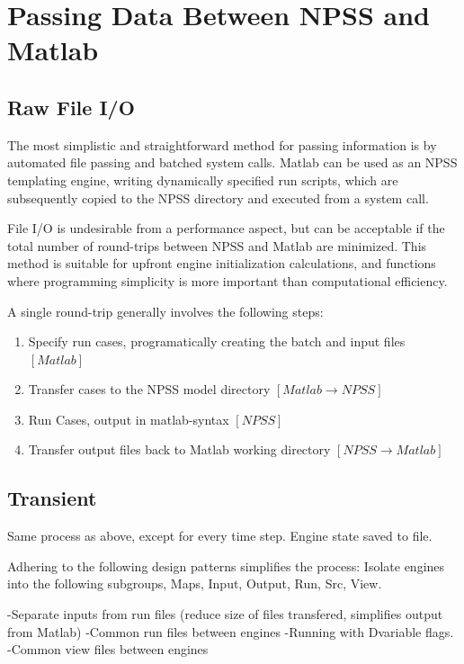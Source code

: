 \documentclass[heading.tex]{subfiles}
\begin{document}
\section{Passing Data Between NPSS and Matlab}
\subsection{Raw File I/O}

The most simplistic and straightforward method for passing information is by automated file passing and batched system calls.
Matlab can be used as an NPSS templating engine, writing dynamically specified run scripts, which are subsequently
copied to the NPSS directory and executed from a system call.

File I/O is undesirable from a performance aspect, but can be acceptable if the total number of round-trips between
NPSS and Matlab are minimized. This method is suitable for upfront engine initialization calculations, 
and functions where programming simplicity is more important than computational efficiency.

A single round-trip generally involves the following steps:

\begin{enumerate}
  \item Specify run cases, programatically creating the batch and input files $[Matlab]$
  \item Transfer cases to the NPSS model directory $[Matlab \rightarrow NPSS]$
  \item Run Cases, output in matlab-syntax $[NPSS]$
  \item Transfer output files back to Matlab working directory $[NPSS \rightarrow Matlab]$
\end{enumerate}

\subsection{Transient}

Same process as above, except for every time step. Engine state saved to file.

Adhering to the following design patterns simplifies the process:
Isolate engines into the following subgroups, Maps, Input, Output, Run, Src, View.

-Separate inputs from run files (reduce size of files transfered, simplifies output from Matlab)
-Common run files between engines -Running with Dvariable flags.
-Common view files between engines
\end{document}
